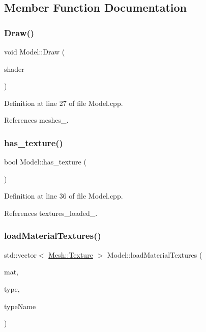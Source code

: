 \subsection{Member Function Documentation}
\mbox{\label{classModel_a191a00d937b9e911bf4881ea14d79b6c}} 
\subsubsection{\texorpdfstring{Draw()}{Draw()}}
{\footnotesize\ttfamily void Model\+::\+Draw (\begin{DoxyParamCaption}\item[{\mbox{\hyperlink{classShader}{Shader}}}]{shader }\end{DoxyParamCaption})}



Definition at line 27 of file Model.\+cpp.



References meshes\+\_\+.

\mbox{\label{classModel_ad4fd21aa8d404f371ea754f5a117e9fb}} 
\subsubsection{\texorpdfstring{has\+\_\+texture()}{has\_texture()}}
{\footnotesize\ttfamily bool Model\+::has\+\_\+texture (\begin{DoxyParamCaption}{ }\end{DoxyParamCaption})}



Definition at line 36 of file Model.\+cpp.



References textures\+\_\+loaded\+\_\+.

\mbox{\label{classModel_aa7d0215f3ee74bef71ddeef173dd36dd}} 
\subsubsection{\texorpdfstring{load\+Material\+Textures()}{loadMaterialTextures()}}
{\footnotesize\ttfamily std\+::vector$<$ \mbox{\hyperlink{structMesh_1_1Texture}{Mesh\+::\+Texture}} $>$ Model\+::load\+Material\+Textures (\begin{DoxyParamCaption}\item[{ai\+Material $\ast$}]{mat,  }\item[{ai\+Texture\+Type}]{type,  }\item[{std\+::string}]{type\+Name }\end{DoxyParamCaption})\hspace{0.3cm}{\ttfamily [protected]}}



